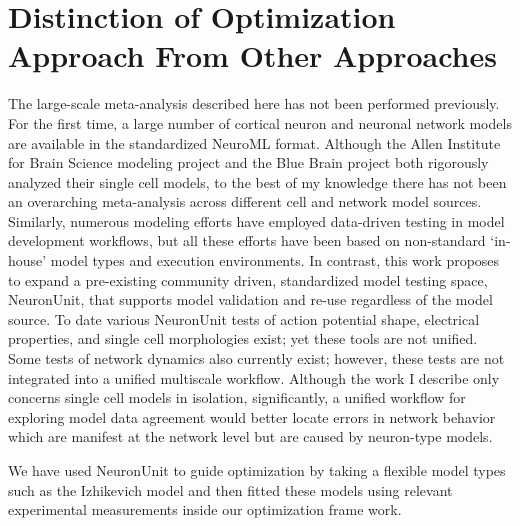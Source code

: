 
\section{Distinction of Optimization Approach From Other Approaches}
The large-scale meta-analysis described here has not been performed previously. For the first time, a large number of cortical neuron and neuronal network models are available in the standardized NeuroML format. Although the Allen Institute for Brain Science modeling project and the Blue Brain project both rigorously analyzed their single cell models, to the best of my knowledge there has not been an overarching meta-analysis across different cell and network model sources.\\

Similarly, numerous modeling efforts have employed data-driven testing in model development workflows, but all these efforts have been based on non-standard ‘in-house’ model types and execution environments. In contrast, this work proposes to expand a pre-existing community driven, standardized model testing space, NeuronUnit, that supports model validation and re-use regardless of the model source. To date various NeuronUnit tests of action potential shape, electrical properties, and single cell morphologies exist; yet these tools are not unified. Some tests of network dynamics also currently exist; however, these tests are not integrated into a unified multiscale workflow. Although the work I describe only concerns single cell models in isolation, significantly, a unified workflow for exploring model data agreement would better locate errors in network behavior which are manifest at the network level but are caused by neuron-type models.

We have used NeuronUnit to guide optimization by taking a flexible model types such as the Izhikevich model and then fitted these models using relevant experimental measurements inside our optimization frame work.

